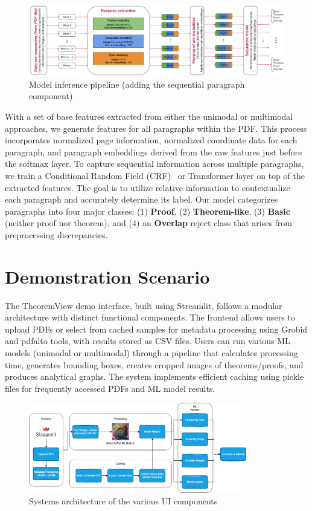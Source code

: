 \documentclass[runningheads]{llncs}
\begin{document}
\begin{figure}[h]
	\centering
	\includegraphics[width=\textwidth]{images/general_pipeline.pdf}
	\caption{Model inference pipeline (adding the sequential paragraph component)}
	\label{fig:generalpipeline}
\end{figure}


With a set of base features extracted from either the unimodal or multimodal approaches, we generate
features for all paragraphs within the PDF. This process incorporates normalized page information,
normalized coordinate data for each paragraph, and paragraph embeddings derived from the raw features
just before the softmax layer. To capture sequential information across multiple paragraphs, we train a
Conditional Random Field (CRF)~\cite{crf} or Transformer layer on top of the extracted features. The goal is to utilize
relative information to contextualize each paragraph and accurately determine its label. Our model
categorizes paragraphs into four major classes: (1) \textbf{Proof}, (2) \textbf{Theorem-like}, (3) \textbf{Basic} (neither
proof nor theorem), and (4) an \textbf{Overlap} reject class that arises from preprocessing discrepancies.

\section{Demonstration Scenario}

The TheoremView demo interface, built using Streamlit, follows a modular architecture with distinct functional components. The frontend allows users to upload PDFs or select from cached samples for metadata processing using Grobid and pdfalto tools, with results stored as CSV files. Users can run various ML models (unimodal or multimodal) through a pipeline that calculates processing time, generates bounding boxes, creates cropped images of theorems/proofs, and produces analytical graphs. The system implements efficient caching using pickle files for frequently accessed PDFs and ML model results.

\begin{figure}[h]
	\centering
	\includegraphics[width=0.85\textwidth]{images/sys-demo-arch.png}
	\caption{Systems architecture of the various UI components
	}
	\label{fig:system-arch}
\end{figure}
\end{document}

